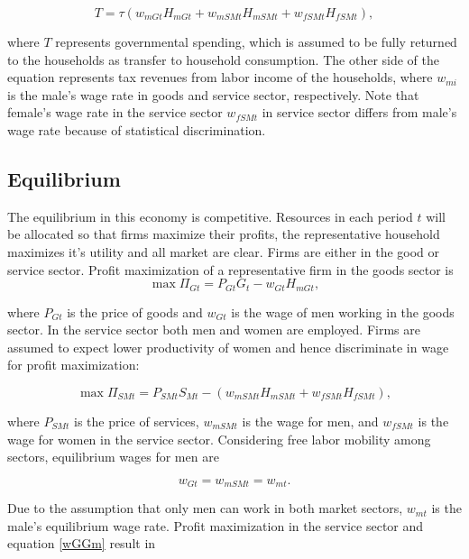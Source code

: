 \documentclass[a4paper,12pt]{article}
\begin{document}
\begin{equation}
\label{T} T = \tau (w_{mGt} H_{mGt} + w_{mSMt} H_{mSMt}+ w_{fSMt} H_{fSMt}), 
\end{equation}

where $T$ represents governmental spending, which is assumed to be fully returned to the households as transfer to household consumption. The other side of the equation represents tax revenues from labor income of the households, where $w_{mi}$ is the male's wage rate in goods and service sector, respectively. Note that female's wage rate in the service sector $w_{fSMt}$ in service sector differs from male's wage rate because of statistical discrimination.

\subsection{Equilibrium}

The equilibrium in this economy is competitive. Resources in each period $t$ will be allocated so that firms maximize their profits, the representative household maximizes it's utility and all market are clear. Firms are either in the good or service sector. Profit maximization of a representative firm in the goods sector is
\begin{equation}
\label{PG}
\max\Pi_{Gt} = P_{Gt} G_t - w_{Gt} H_{mGt},
\end{equation}

where $P_{Gt}$ is the price of goods and $w_{Gt}$ is the wage of men working in the goods sector. In the service sector both men and women are employed. Firms are assumed to expect lower productivity of women and hence discriminate in wage for profit maximization:

\begin{equation}
\label{PSM}
\max\Pi_{SMt} = P_{SMt} S_{Mt} - (w_{mSMt} H_{mSMt}+ w_{fSMt} H_{fSMt}),
\end{equation}

where $P_{SMt}$ is the price of services, $w_{mSMt}$ is the wage for men, and $w_{fSMt}$ is the wage for women in the service sector. Considering free labor mobility among sectors, equilibrium wages for men are

\begin{equation}\label{wGGm}
	 w_{Gt} = w_{mSMt} = w_{mt}.
\end{equation}

Due to the assumption that only men can work in both market sectors, $w_{mt}$ is the male's equilibrium wage rate. Profit maximization in the service sector and equation \eqref{wGGm} result in
\end{document}
